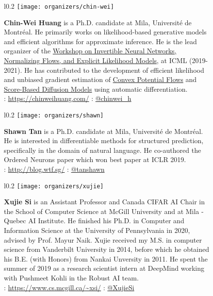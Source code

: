 \documentclass{article}
\begin{document}
    \begin{figure}[H]
        \begin{wrapfigure}{l}{0.2\textwidth}
            \texttt{[image: organizers/chin-wei]}
        \end{wrapfigure}
        \textbf{Chin-Wei Huang}
        is a Ph.D. candidate at Mila, Universit\'e de Montr\'eal.
        He primarily works on likelihood-based generative models and efficient algorithms for approximate inference.
        He is the lead organizer of the \href{https://invertibleworkshop.github.io/}{Workshop on Invertible Neural Networks, Normalizing Flows, and Explicit Likelihood Models}, at ICML (2019-2021).
        He has contributed to the development of efficient likelihood and unbiased gradient estimation of \href{https://arxiv.org/abs/2012.05942}{Convex Potential Flows} and \href{https://arxiv.org/abs/2106.02808}{Score-Based Diffusion Models} using automatic differentiation.
        \\
        \faHome: \url{https://chinweihuang.com/} \faTwitter: \href{https://twitter.com/chinwei_h}{@chinwei\_h}
    \end{figure}

    \begin{figure}[H]
        \begin{wrapfigure}{l}{0.2\textwidth}
            \texttt{[image: organizers/shawn]}
        \end{wrapfigure}
        \textbf{Shawn Tan} is a Ph.D. candidate at Mila, Universit\'e de Montr\'eal.
        He is interested in differentiable methods for structured prediction, specifically in the domain of natural language.
        He co-authored the Ordered Neurons paper which won best paper at ICLR 2019.
        \\
        \faHome: \url{http://blog.wtf.sg/} \faTwitter: \href{https://twitter.com/tanshawn}{@tanshawn}
    \end{figure}

    \pagebreak
    \begin{figure}[H]
        \begin{wrapfigure}{l}{0.2\textwidth}
            \texttt{[image: organizers/xujie]}
        \end{wrapfigure}
        \textbf{Xujie Si} is an Assistant Professor and Canada CIFAR AI Chair in the School of Computer Science at McGill University and at Mila - Quebec AI Institute. He finished his Ph.D. in Computer and Information Science at the University of Pennsylvania in 2020, advised by Prof. Mayur Naik. Xujie received my M.S. in computer science from Vanderbilt University in 2014, before which he obtained his B.E. (with Honors) from Nankai Unversity in 2011. He spent the summer of 2019 as a research scientist intern at DeepMind working with Pushmeet Kohli in the Robust AI team.\\
        \faHome: \url{https://www.cs.mcgill.ca/~xsi/} \faTwitter: \href{https://twitter.com/xujiesi}{@XujieSi}
    \end{figure}
\end{document}
